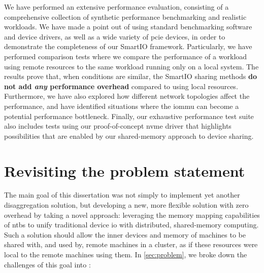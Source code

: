We have performed an extensive performance evaluation, consisting of a comprehensive collection of synthetic performance benchmarking and realistic workloads.
%
We have made a point out of using standard benchmarking software and device drivers, as well as a wide variety of \gls{pcie} devices, in order to demonstrate the completeness of our SmartIO framework.
%
Particularly, we have performed comparison tests where we compare the performance of a workload using remote resources to the same workload running only on a local system.
%
The results prove that, when conditions are similar, the SmartIO sharing methods \textbf{do not add \emph{any} performance overhead} compared to using local resources.
%
Furthermore, we have also explored how different network topologies affect the performance, and have identified situations where the \gls{iommu} can become a potential performance bottleneck.
%
Finally, our exhaustive performance test suite also includes tests using our proof-of-concept \gls{nvme} driver that highlights possibilities that are enabled by our shared-memory approach to device sharing.






\section{Revisiting the problem statement}\label{sec:discussion}
%
%
%
The main goal of this dissertation was not simply to implement yet another \gls{disaggregation} solution, but developing a new, more flexible solution with zero overhead by taking a novel approach:
%
leveraging the memory mapping capabilities of \glspl{ntb} to unify traditional device \gls{io} with distributed, shared-memory computing.
%
Such a solution should allow the inner devices and memory of machines to be shared with, and used by, remote machines in a cluster, as if these resources were local to the remote machines using them.
%
In \cref{sec:problem}, we broke down the challenges of this goal into :



